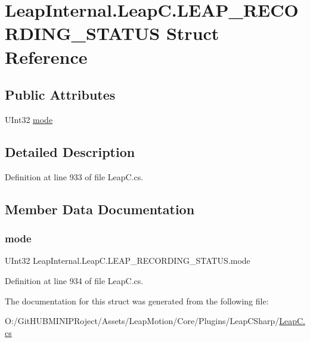 \hypertarget{struct_leap_internal_1_1_leap_c_1_1_l_e_a_p___r_e_c_o_r_d_i_n_g___s_t_a_t_u_s}{}\section{Leap\+Internal.\+Leap\+C.\+L\+E\+A\+P\+\_\+\+R\+E\+C\+O\+R\+D\+I\+N\+G\+\_\+\+S\+T\+A\+T\+US Struct Reference}
\label{struct_leap_internal_1_1_leap_c_1_1_l_e_a_p___r_e_c_o_r_d_i_n_g___s_t_a_t_u_s}
\subsection*{Public Attributes}
\begin{DoxyCompactItemize}
\item 
U\+Int32 \mbox{\hyperlink{struct_leap_internal_1_1_leap_c_1_1_l_e_a_p___r_e_c_o_r_d_i_n_g___s_t_a_t_u_s_aa3b9240d430b4f93730d6974c81c6bf4}{mode}}
\end{DoxyCompactItemize}


\subsection{Detailed Description}


Definition at line 933 of file Leap\+C.\+cs.



\subsection{Member Data Documentation}
\mbox{\label{struct_leap_internal_1_1_leap_c_1_1_l_e_a_p___r_e_c_o_r_d_i_n_g___s_t_a_t_u_s_aa3b9240d430b4f93730d6974c81c6bf4}} 
\subsubsection{\texorpdfstring{mode}{mode}}
{\footnotesize\ttfamily U\+Int32 Leap\+Internal.\+Leap\+C.\+L\+E\+A\+P\+\_\+\+R\+E\+C\+O\+R\+D\+I\+N\+G\+\_\+\+S\+T\+A\+T\+U\+S.\+mode}



Definition at line 934 of file Leap\+C.\+cs.



The documentation for this struct was generated from the following file\+:\begin{DoxyCompactItemize}
\item 
O\+:/\+Git\+H\+U\+B\+M\+I\+N\+I\+P\+Roject/\+Assets/\+Leap\+Motion/\+Core/\+Plugins/\+Leap\+C\+Sharp/\mbox{\hyperlink{_leap_c_8cs}{Leap\+C.\+cs}}\end{DoxyCompactItemize}
